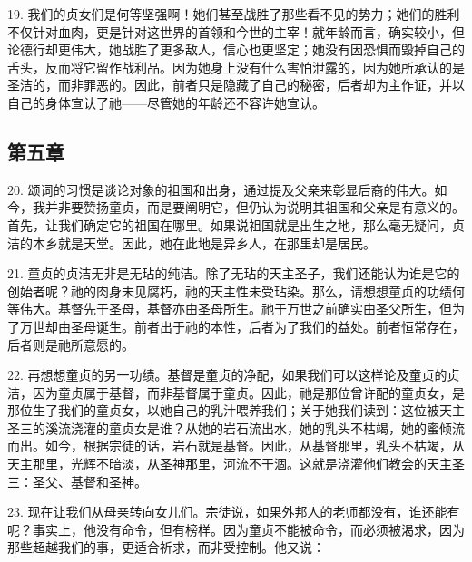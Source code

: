 19. 我们的贞女们是何等坚强啊！她们甚至战胜了那些看不见的势力；她们的胜利不仅针对血肉，更是针对这世界的首领和今世的主宰！就年龄而言，确实较小，但论德行却更伟大，她战胜了更多敌人，信心也更坚定；她没有因恐惧而毁掉自己的舌头，反而将它留作战利品。因为她身上没有什么害怕泄露的，因为她所承认的是圣洁的，而非罪恶的。因此，前者只是隐藏了自己的秘密，后者却为主作证，并以自己的身体宣认了祂——尽管她的年龄还不容许她宣认。\par


\subsection{第五章}

\par

20. 颂词的习惯是谈论对象的祖国和出身，通过提及父亲来彰显后裔的伟大。如今，我并非要赞扬童贞，而是要阐明它，但仍认为说明其祖国和父亲是有意义的。首先，让我们确定它的祖国在哪里。如果说祖国就是出生之地，那么毫无疑问，贞洁的本乡就是天堂。因此，她在此地是异乡人，在那里却是居民。\par

21. 童贞的贞洁无非是无玷的纯洁。除了无玷的天主圣子，我们还能认为谁是它的创始者呢？祂的肉身未见腐朽，祂的天主性未受玷染。那么，请想想童贞的功绩何等伟大。基督先于圣母，基督亦由圣母所生。祂于万世之前确实由圣父所生，但为了万世却由圣母诞生。前者出于祂的本性，后者为了我们的益处。前者恒常存在，后者则是祂所意愿的。\par

22. 再想想童贞的另一功绩。基督是童贞的净配，如果我们可以这样论及童贞的贞洁，因为童贞属于基督，而非基督属于童贞。因此，祂是那位曾许配的童贞女，是那位生了我们的童贞女，以她自己的乳汁喂养我们；关于她我们读到：这位被天主圣三的溪流浇灌的童贞女是谁？从她的岩石流出水，她的乳头不枯竭，她的蜜倾流而出。如今，根据宗徒的话，岩石就是基督。因此，从基督那里，乳头不枯竭，从天主那里，光辉不暗淡，从圣神那里，河流不干涸。这就是浇灌他们教会的天主圣三：圣父、基督和圣神。\par

23. 现在让我们从母亲转向女儿们。宗徒说，如果外邦人的老师都没有，谁还能有呢？事实上，他没有命令，但有榜样。因为童贞不能被命令，而必须被渴求，因为那些超越我们的事，更适合祈求，而非受控制。他又说：\par

